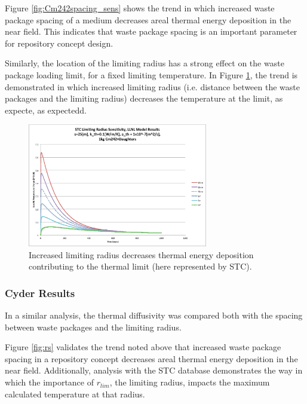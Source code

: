 Figure \ref{fig:Cm242spacing_sens} shows the trend in which increased waste package spacing of a medium decreases areal thermal energy 
deposition in the near field. This indicates that waste package spacing is 
an important parameter for repository concept design.

Similarly, the location of the limiting radius has a strong effect on the 
waste package loading limit, for a fixed limiting temperature. In Figure 
\ref{fig:Cm242r_lim_sens}, the trend is demonstrated in which increased limiting 
radius (i.e. distance between the waste packages and the limiting radius) 
decreases the temperature at the limit, as expecte, as expectedd.


\begin{figure}[htbp!]
\begin{center}
\includegraphics[width=0.7\textwidth]{./chapters/demonstration/spacing/Cm242r_lim_sens.eps}
\end{center}
\caption[Thermal Sensitivity to $r_{lim}$ and $s_{wp}$]{Increased limiting radius 
decreases thermal energy deposition contributing to the thermal limit
(here represented by \gls{STC}).}
\label{fig:Cm242r_lim_sens}
\end{figure}


\FloatBarrier
\subsubsection{Cyder Results}

In a similar analysis, the thermal diffusivity was compared both with the 
spacing between waste packages and the limiting radius. 

Figure \ref{fig:rs} validates the trend noted above that 
increased waste package spacing in a repository concept decreases areal thermal energy deposition 
in the near field.  Additionally, analysis with the \Cyder STC database 
demonstrates the way in which the importance of $r_{lim}$, the limiting radius, 
impacts the maximum calculated temperature at that radius. 


